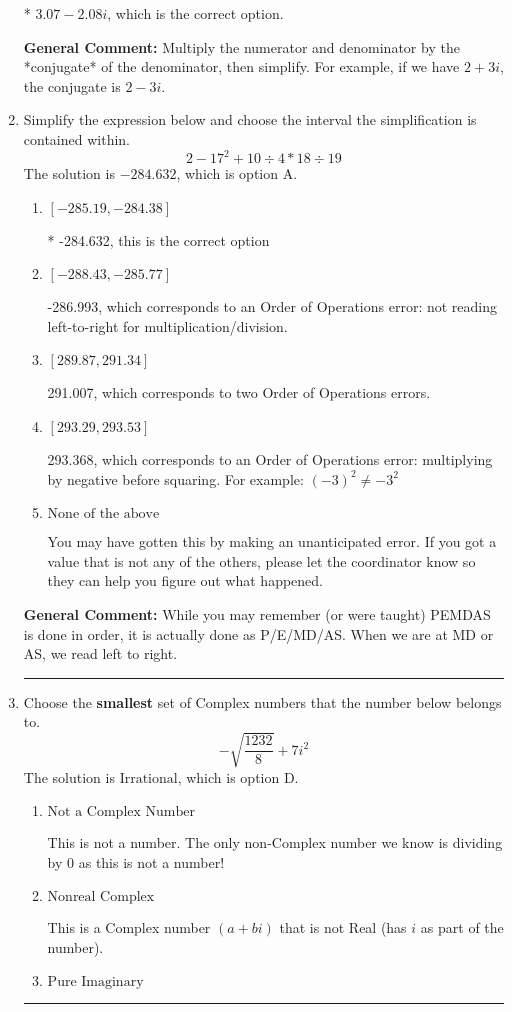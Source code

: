 \documentclass{extbook}[14pt]
\newcommand{\litem}[1]{\item #1

\rule{\textwidth}{0.4pt}}
\begin{document}
\begin{enumerate}
{\begin{enumerate}[label=\Alph*.]
* $3.07  - 2.08 i$, which is the correct option.
\end{enumerate}

\textbf{General Comment:} Multiply the numerator and denominator by the *conjugate* of the denominator, then simplify. For example, if we have $2+3i$, the conjugate is $2-3i$.
}
\litem{
Simplify the expression below and choose the interval the simplification is contained within.
\[ 2 - 17^2 + 10 \div 4 * 18 \div 19 \]
The solution is \( -284.632 \), which is option A.\begin{enumerate}[label=\Alph*.]
\item \( [-285.19, -284.38] \)

* -284.632, this is the correct option
\item \( [-288.43, -285.77] \)

 -286.993, which corresponds to an Order of Operations error: not reading left-to-right for multiplication/division.
\item \( [289.87, 291.34] \)

 291.007, which corresponds to two Order of Operations errors.
\item \( [293.29, 293.53] \)

 293.368, which corresponds to an Order of Operations error: multiplying by negative before squaring. For example: $(-3)^2 \neq -3^2$
\item \( \text{None of the above} \)

 You may have gotten this by making an unanticipated error. If you got a value that is not any of the others, please let the coordinator know so they can help you figure out what happened.
\end{enumerate}

\textbf{General Comment:} While you may remember (or were taught) PEMDAS is done in order, it is actually done as P/E/MD/AS. When we are at MD or AS, we read left to right.
}
\litem{
Choose the \textbf{smallest} set of Complex numbers that the number below belongs to.
\[ -\sqrt{\frac{1232}{8}}+7i^2 \]
The solution is \( \text{Irrational} \), which is option D.\begin{enumerate}[label=\Alph*.]
\item \( \text{Not a Complex Number} \)

This is not a number. The only non-Complex number we know is dividing by 0 as this is not a number!
\item \( \text{Nonreal Complex} \)

This is a Complex number $(a+bi)$ that is not Real (has $i$ as part of the number).
\item \( \text{Pure Imaginary} \)


\end{enumerate}}
\end{enumerate}
\end{document}

